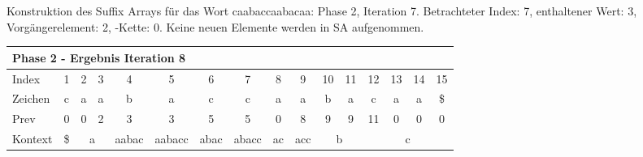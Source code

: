 \begin{table}[H]
\caption[Konstruktion des Suffix Arrays für das Wort caabaccaabacaa: Phase 2, Iteration 7]{Konstruktion des Suffix Arrays für das Wort caabaccaabacaa: Phase 2, Iteration 7. Betrachteter Index: 7, enthaltener Wert: 3, Vorgängerelement: 2, \prevpointer-Kette: 0. Keine neuen Elemente werden in SA aufgenommen.}
\label{table_complex_example_2_7} 
\end{table}

\begin{table}[H]
\centering
\begin{adjustbox}{max width=\textwidth}
\centering
\begin{tabular}{lccccccccccccccc}
\multicolumn{16}{l}{Phase 2 - Ergebnis Iteration 8}                                                                                                                                                                                                                                                                                                                   \\ \hline
\multicolumn{1}{l|}{Index}   & 1                       & 2  & 3                       & 4                          & 5                           & 6                         & 7                          & 8                                               & 9                        & 10                         & 11                      & 12  & 13  & 14  & 15  \\
\multicolumn{1}{l|}{Zeichen} & c                       & a  & a                       & b                          & a                           & c                         & c                          & a                                               & a                        & b                          & a                       & c   & a   & a   & \$  \\
\multicolumn{1}{l|}{Prev}    & 0                       & 0  & 2                       & 3                          & 3                           & 5                         & 5                          & 0                                               & 8                        & 9                          & 9                       & 11  & 0   & 0   & 0   \\ \hline
\multicolumn{1}{l|}{Kontext} & \multicolumn{1}{c|}{\$} & \multicolumn{2}{c|}{a}       & \multicolumn{1}{c|}{aabac} & \multicolumn{1}{c|}{aabacc} & \multicolumn{1}{c|}{abac} & \multicolumn{1}{c|}{abacc} & \multicolumn{1}{c|}{ac}                         & \multicolumn{1}{c|}{acc} & \multicolumn{2}{c|}{b}                               & \multicolumn{4}{c}{c} \\

\end{tabular}
\end{adjustbox}
\end{table}
